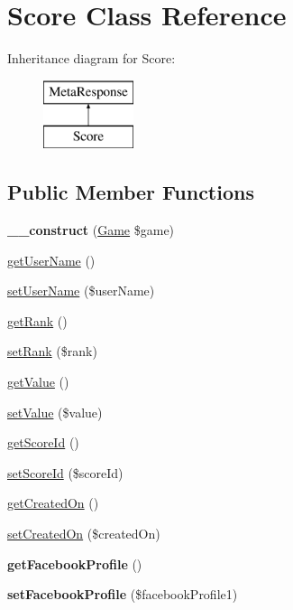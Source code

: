 \hypertarget{class_score}{\section{Score Class Reference}
\label{class_score}
}
Inheritance diagram for Score\+:\begin{figure}[H]
\begin{center}
\leavevmode
\includegraphics[height=2.000000cm]{class_score}
\end{center}
\end{figure}
\subsection*{Public Member Functions}
\begin{DoxyCompactItemize}
\item 
\hypertarget{class_score_aed603d26294ad01160f1b948f2ef2791}{{\bfseries \+\_\+\+\_\+construct} (\hyperlink{class_game}{Game} \$game)}\label{class_score_aed603d26294ad01160f1b948f2ef2791}

\item 
\hyperlink{class_score_aafd6d1ef27e6acc5833aba4012e5ee77}{get\+User\+Name} ()
\item 
\hyperlink{class_score_a20f0087f72763b84d2992ba6ffee2fb2}{set\+User\+Name} (\$user\+Name)
\item 
\hyperlink{class_score_ad9b18cc3c110ea0dc7bd67a701d12a92}{get\+Rank} ()
\item 
\hyperlink{class_score_aa3513fc15cfb4ce47e47f9b47eda195b}{set\+Rank} (\$rank)
\item 
\hyperlink{class_score_ac0bc18784b182c89fcfd276625aef435}{get\+Value} ()
\item 
\hyperlink{class_score_a7494441b6ed08a391704971873f31432}{set\+Value} (\$value)
\item 
\hyperlink{class_score_a409dcef038e03470c3aae7fc64a5e829}{get\+Score\+Id} ()
\item 
\hyperlink{class_score_a19ba9107e47a3971ddc84036c4cfd510}{set\+Score\+Id} (\$score\+Id)
\item 
\hyperlink{class_score_a346b90b05b25684ab3d2c62566270551}{get\+Created\+On} ()
\item 
\hyperlink{class_score_adff89ef96f7c1e0f0752caca8ccc750b}{set\+Created\+On} (\$created\+On)
\item 
\hypertarget{class_score_ab81d8838835b082636e3c77b4dfcc55b}{{\bfseries get\+Facebook\+Profile} ()}\label{class_score_ab81d8838835b082636e3c77b4dfcc55b}

\item 
\hypertarget{class_score_a411ce5ddb93610159bebe0312a959195}{{\bfseries set\+Facebook\+Profile} (\$facebook\+Profile1)}\label{class_score_a411ce5ddb93610159bebe0312a959195}

\end{DoxyCompactItemize}
